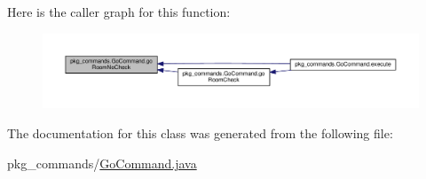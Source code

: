 Here is the caller graph for this function\-:\nopagebreak
\begin{figure}[H]
\begin{center}
\leavevmode
\includegraphics[width=350pt]{classpkg__commands_1_1GoCommand_a210afbc5f3ef34d3ad5759d853c8f8c2_icgraph}
\end{center}
\end{figure}




The documentation for this class was generated from the following file\-:\begin{DoxyCompactItemize}
\item 
pkg\-\_\-commands/\hyperlink{GoCommand_8java}{Go\-Command.\-java}\end{DoxyCompactItemize}
